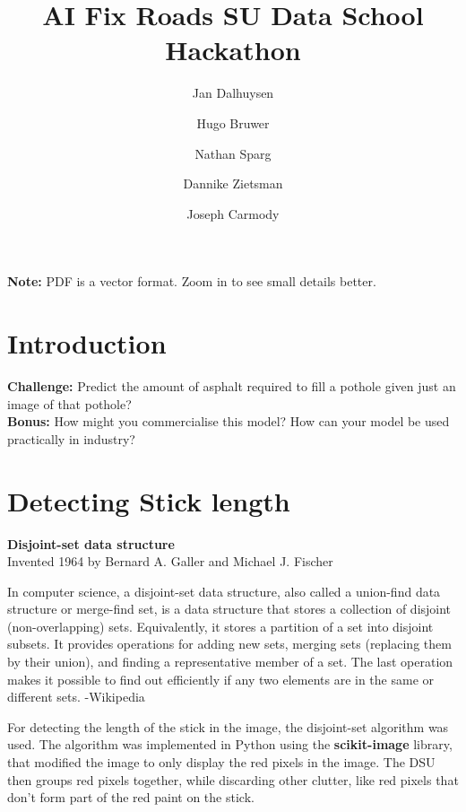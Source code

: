 \documentclass[8pt]{extarticle}
\title{AI Fix Roads SU Data School Hackathon}
\author{Jan Dalhuysen \and Hugo Bruwer \and Nathan Sparg \and Dannike Zietsman \and Joseph Carmody}
\date{}
\begin{document}
\maketitle

\vspace{5px}

\begin{center}
\textbf{Note:} PDF is a vector format. Zoom in to see small details better.
\end{center}

\vspace{10px}

\section{Introduction}

\textbf{Challenge:} Predict the amount of asphalt required to fill a pothole given just an image of that pothole? \\
\textbf{Bonus:} How might you commercialise this model? How can your model be used practically in industry?

\section{Detecting Stick length}

\textbf{Disjoint-set data structure} \\

\noindent Invented 1964 by Bernard A. Galler and Michael J. Fischer

\noindent In computer science, a disjoint-set data structure, also called a union-find data structure or merge-find set, is a data structure that stores a collection of disjoint (non-overlapping) sets. Equivalently, it stores a partition of a set into disjoint subsets. It provides operations for adding new sets, merging sets (replacing them by their union), and finding a representative member of a set. The last operation makes it possible to find out efficiently if any two elements are in the same or different sets. -Wikipedia

\noindent For detecting the length of the stick in the image, the disjoint-set algorithm was used. The algorithm was implemented in Python using the \textbf{scikit-image} library, that modified the image to only display the red pixels in the image. The DSU then groups red pixels together, while discarding other clutter, like red pixels that don't form part of the red paint on the stick.
\end{document}

